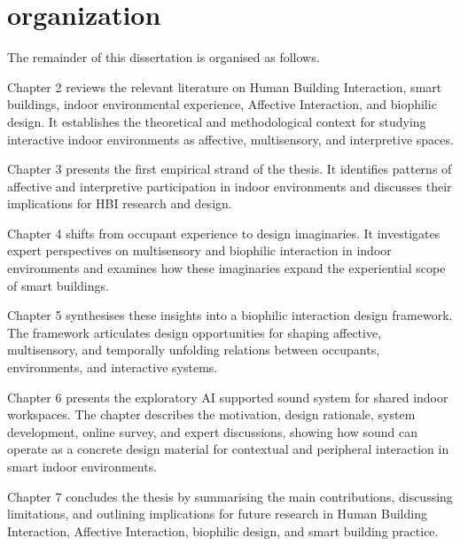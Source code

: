 \section{organization}

The remainder of this dissertation is organised as follows.

Chapter 2 reviews the relevant literature on Human Building Interaction, smart buildings, indoor environmental experience, Affective Interaction, and biophilic design. It establishes the theoretical and methodological context for studying interactive indoor environments as affective, multisensory, and interpretive spaces.

Chapter 3 presents the first empirical strand of the thesis. It identifies patterns of affective and interpretive participation in indoor environments and discusses their implications for HBI research and design.

Chapter 4 shifts from occupant experience to design imaginaries. It investigates expert perspectives on multisensory and biophilic interaction in indoor environments and examines how these imaginaries expand the experiential scope of smart buildings.

Chapter 5 synthesises these insights into a biophilic interaction design framework. The framework articulates design opportunities for shaping affective, multisensory, and temporally unfolding relations between occupants, environments, and interactive systems.

Chapter 6 presents the exploratory AI supported sound system for shared indoor workspaces. The chapter describes the motivation, design rationale, system development, online survey, and expert discussions, showing how sound can operate as a concrete design material for contextual and peripheral interaction in smart indoor environments.

Chapter 7 concludes the thesis by summarising the main contributions, discussing limitations, and outlining implications for future research in Human Building Interaction, Affective Interaction, biophilic design, and smart building practice.
